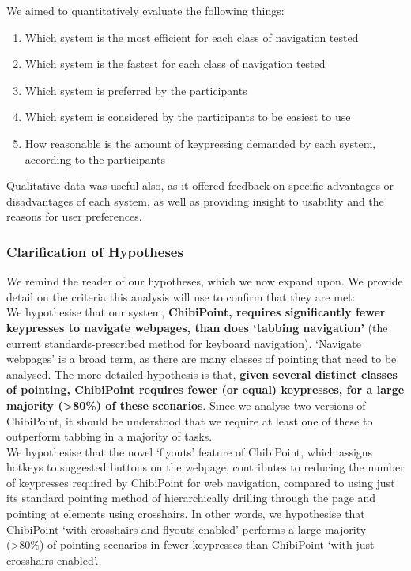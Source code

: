 \documentclass[11pt,openright,a4paper]{report}
\begin{document}
We aimed to quantitatively evaluate the following things:
\begin{enumerate}
\item Which system is the most efficient for each class of navigation tested
\item Which system is the fastest for each class of navigation tested
\item Which system is preferred by the participants
\item Which system is considered by the participants to be easiest to use
\item How reasonable is the amount of keypressing demanded by each system, according to the participants
\end{enumerate}

Qualitative data was useful also, as it offered feedback on specific advantages or disadvantages of each system, as well as providing insight to usability and the reasons for user preferences.

\subsubsection{Clarification of Hypotheses}
\label{sec:detailedhyp}
We remind the reader of our hypotheses, which we now expand upon. We provide detail on the criteria this analysis will use to confirm that they are met:
\textbf{\hypone}\\
We hypothesise that our system, \textbf{ChibiPoint, requires significantly fewer keypresses to navigate webpages, than does `tabbing navigation'} (the current standards-prescribed method for keyboard navigation).
`Navigate webpages' is a broad term, as there are many classes of pointing that need to be analysed. The more detailed hypothesis is that, \textbf{given several distinct classes of pointing, ChibiPoint requires fewer (or equal) keypresses, for a large majority (>80\%) of these scenarios}. Since we analyse two versions of ChibiPoint, it should be understood that we require at least one of these to outperform tabbing in a majority of tasks.
\textbf{\hyptwo}\\
We hypothesise that the novel `flyouts' feature of ChibiPoint, which assigns hotkeys to suggested buttons on the webpage, contributes to reducing the number of keypresses required by ChibiPoint for web navigation, compared to using just its standard pointing method of hierarchically drilling through the page and pointing at elements using crosshairs.
In other words, we hypothesise that ChibiPoint `with crosshairs and flyouts enabled' performs a large majority (>80\%) of pointing scenarios in fewer keypresses than ChibiPoint `with just crosshairs enabled'.
\end{document}
